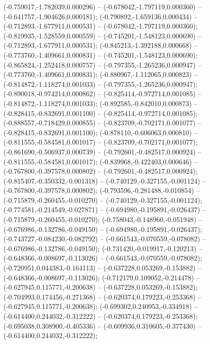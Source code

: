  (-0.759017,-1.782039,0.000296) -- (-0.678042,-1.797119,0.000360) -- (-0.641757,-1.904626,0.000181);
 (-0.790892,-1.659136,0.000434) -- (-0.712893,-1.677911,0.000531) -- (-0.678042,-1.797119,0.000360);
 (-0.819935,-1.528559,0.000559) -- (-0.745201,-1.548123,0.000690) -- (-0.712893,-1.677911,0.000531);
 (-0.845213,-1.392188,0.000668) -- (-0.773760,-1.409661,0.000831) -- (-0.745201,-1.548123,0.000690);
 (-0.865824,-1.252418,0.000757) -- (-0.797355,-1.265236,0.000947) -- (-0.773760,-1.409661,0.000831);
 (-0.880967,-1.112065,0.000823) -- (-0.814872,-1.118274,0.001033) -- (-0.797355,-1.265236,0.000947);
 (-0.890018,-0.974214,0.000862) -- (-0.825414,-0.972714,0.001085) -- (-0.814872,-1.118274,0.001033);
 (-0.892585,-0.842010,0.000873) -- (-0.828415,-0.832691,0.001100) -- (-0.825414,-0.972714,0.001085);
 (-0.888557,-0.718429,0.000855) -- (-0.823709,-0.702171,0.001077) -- (-0.828415,-0.832691,0.001100);
 (-0.878110,-0.606063,0.000810) -- (-0.811555,-0.584581,0.001017) -- (-0.823709,-0.702171,0.001077);
 (-0.861690,-0.506937,0.000739) -- (-0.792601,-0.482517,0.000924) -- (-0.811555,-0.584581,0.001017);
 (-0.839968,-0.422403,0.000646) -- (-0.767800,-0.397578,0.000802) -- (-0.792601,-0.482517,0.000924);
 (-0.815407,-0.350332,-0.001318) -- (-0.740129,-0.327155,-0.001124) -- (-0.767800,-0.397578,0.000802);
 (-0.793596,-0.281488,-0.010854) -- (-0.715879,-0.260455,-0.010270) -- (-0.740129,-0.327155,-0.001124);
 (-0.774581,-0.214549,-0.027871) -- (-0.694980,-0.195891,-0.026437) -- (-0.715879,-0.260455,-0.010270);
 (-0.758043,-0.148960,-0.051948) -- (-0.676986,-0.132786,-0.049150) -- (-0.694980,-0.195891,-0.026437);
 (-0.743727,-0.084230,-0.082792) -- (-0.661543,-0.070559,-0.078082) -- (-0.676986,-0.132786,-0.049150);
 (-0.731420,-0.019917,-0.120213) -- (-0.648366,-0.008697,-0.113026) -- (-0.661543,-0.070559,-0.078082);
 (-0.720951,0.044383,-0.164113) -- (-0.637228,0.053269,-0.153882) -- (-0.648366,-0.008697,-0.113026);
 (-0.712179,0.109052,-0.214478) -- (-0.627945,0.115771,-0.200638) -- (-0.637228,0.053269,-0.153882);
 (-0.704993,0.174456,-0.271368) -- (-0.620374,0.179223,-0.253368) -- (-0.627945,0.115771,-0.200638);
 (-0.699302,0.240953,-0.334918) -- (-0.614400,0.244032,-0.312222) -- (-0.620374,0.179223,-0.253368);
 (-0.695038,0.308900,-0.405336) -- (-0.609936,0.310605,-0.377430) -- (-0.614400,0.244032,-0.312222);

